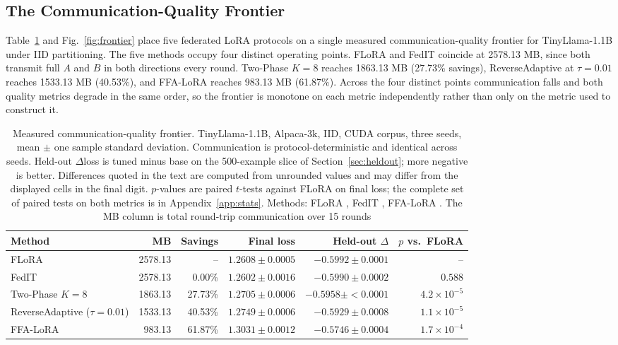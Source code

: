 \subsection{The Communication-Quality Frontier}
\label{sec:frontier}
Table~\ref{tab:frontier} and Fig.~\ref{fig:frontier} place five federated LoRA protocols on a single measured communication-quality frontier for TinyLlama-1.1B \cite{zhang2024tinyllama} under IID partitioning. The five methods occupy four distinct operating points. FLoRA \cite{wang2024flora} and FedIT \cite{zhang2024federatedgpt} coincide at 2578.13 MB, since both transmit full $A$ and $B$ in both directions every round. Two-Phase $K{=}8$ reaches 1863.13 MB (27.73\% savings), ReverseAdaptive at $\tau{=}0.01$ reaches 1533.13 MB (40.53\%), and FFA-LoRA \cite{sun2024ffalora} reaches 983.13 MB (61.87\%). Across the four distinct points communication falls and both quality metrics degrade in the same order, so the frontier is monotone on each metric independently rather than only on the metric used to construct it.

\begin{table}[tbp]
\centering
\footnotesize
\setlength{\tabcolsep}{6pt}
\caption{Measured communication-quality frontier. TinyLlama-1.1B, Alpaca-3k, IID, CUDA corpus, three seeds, mean $\pm$ one sample standard deviation. Communication is protocol-deterministic and identical across seeds. Held-out $\Delta$loss is tuned minus base on the 500-example slice of Section~\ref{sec:heldout}; more negative is better. Differences quoted in the text are computed from unrounded values and may differ from the displayed cells in the final digit. $p$-values are paired $t$-tests against FLoRA on final loss; the complete set of paired tests on both metrics is in Appendix~\ref{app:stats}. Methods: FLoRA \cite{wang2024flora}, FedIT \cite{zhang2024federatedgpt}, FFA-LoRA \cite{sun2024ffalora}. The MB column is total round-trip communication over 15 rounds}
\label{tab:frontier}
\begin{tabular}{@{}lrrrrr@{}}
\toprule
Method & MB & Savings & Final loss & Held-out $\Delta$ & $p$ vs.\ FLoRA \\
\midrule
FLoRA                                 & 2578.13 & --      & $1.2608 \pm 0.0005$ & $-0.5992 \pm 0.0001$ & -- \\
FedIT                                 & 2578.13 & 0.00\%  & $1.2602 \pm 0.0016$ & $-0.5990 \pm 0.0002$ & $0.588$ \\
Two-Phase $K{=}8$                   & 1863.13 & 27.73\% & $1.2705 \pm 0.0006$ & $-0.5958 \pm {<}0.0001$ & $4.2 \times 10^{-5}$ \\
ReverseAdaptive ($\tau{=}0.01$)     & 1533.13 & 40.53\% & $1.2749 \pm 0.0006$ & $-0.5929 \pm 0.0008$ & $1.1 \times 10^{-5}$ \\
FFA-LoRA                             & 983.13 & 61.87\% & $1.3031 \pm 0.0012$ & $-0.5746 \pm 0.0004$ & $1.7 \times 10^{-4}$ \\
\bottomrule
\end{tabular}
\end{table}


